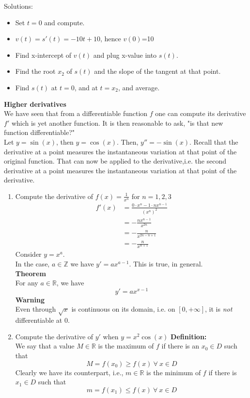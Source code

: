 \documentclass[]{article}
\begin{document}
	Solutions:
	\begin{itemize}
		\item Set $t=0$ and compute.
		\item $v(t)=s'(t)=-10t+10$, hence $v(0)$=10
		\item Find x-intercept of $v(t)$ and plug x-value into $s(t)$.
		\item Find the root $x_2$ of $s(t)$ and the slope of the tangent at that point.
		\item Find $s(t)$ at $t=0$, and at $t=x_2$, and average.
	\end{itemize}
	{\bf Higher derivatives}\\
	We have seen that from a differentiable function $f$ one can compute its derivative $f'$ which is yet another function. It is then reasonable to ask, "is that new function differentiable?"\\
	Let $y=\sin(x)$, then $y=\cos(x)$. Then, $y''=-\sin(x)$.
	Recall that the derivative at a point measures the instantaneous variation at that point of the original function. That can now be applied to the derivative,i.e. the second derivative at a point measures the instantaneous variation at that point of the derivative.\\
	\begin{enumerate}
		\item Compute the derivative of $f(x)=\frac{1}{x^n}$ for $n=1,2,3$\\
		\begin{align*}
			f'(x)&=\frac{0\cdot x^n-1\cdot nx^{n-1}}{(x^n)^2}\\
			&=-\frac{nx^{n-1}}{x^{2n}}\\
			&=-\frac{n}{x^{2n-n+1}}\\
			&=-\frac{n}{x^{n+1}}
		\end{align*}
		Consider $y=x^a$.\\
		In the case, $a\in\mathbb{Z}$ we have $y'=ax^{a-1}$. This is true, in general.\\
		{\bf Theorem}\\
		For any $a\in\mathbb{R}$, we have
		$$
			y'=ax^{x-1}
		$$
		{\bf Warning}\\
		Even through $\sqrt{x}$ is continuous on its domain, i.e. on $[0,+\infty]$, it is \emph{not} differentiable at 0.\\
		\item Compute the derivative of $y'$ when $y=x^2\cos(x)$
		{\bf Definition:}\\
		We say that a value $M\in\mathbb{R}$ is the maximum of $f$ if there is an $x_0\in D$ such that 
		$$
			M=f(x_0)\ge f(x)~\forall~x\in D
		$$
		Clearly we have its counterpart, i.e., $m\in\mathbb{R}$ is the minimum of $f$ if there is $x_1\in D$ such that
		$$
			m=f(x_1)\le f(x)~\forall~x\in D
		$$
	\end{enumerate}
\end{document}
